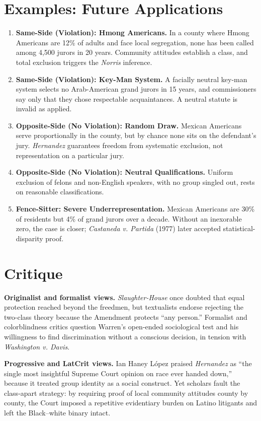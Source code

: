\documentclass[12pt]{article}
\begin{document}
\section{Examples: Future Applications}

\begin{enumerate}
\item \textbf{Same-Side (Violation): Hmong Americans.} In a county where Hmong Americans are 12\% of adults and face local segregation, none has been called among 4,500 jurors in 20 years. Community attitudes establish a class, and total exclusion triggers the \textit{Norris} inference.
\item \textbf{Same-Side (Violation): Key-Man System.} A facially neutral key-man system selects no Arab-American grand jurors in 15 years, and commissioners say only that they chose respectable acquaintances. A neutral statute is invalid as applied.
\item \textbf{Opposite-Side (No Violation): Random Draw.} Mexican Americans serve proportionally in the county, but by chance none sits on the defendant's jury. \textit{Hernandez} guarantees freedom from systematic exclusion, not representation on a particular jury.
\item \textbf{Opposite-Side (No Violation): Neutral Qualifications.} Uniform exclusion of felons and non-English speakers, with no group singled out, rests on reasonable classifications.
\item \textbf{Fence-Sitter: Severe Underrepresentation.} Mexican Americans are 30\% of residents but 4\% of grand jurors over a decade. Without an inexorable zero, the case is closer; \textit{Castaneda v. Partida} (1977) later accepted statistical-disparity proof.
\end{enumerate}

\section{Critique}

\textbf{Originalist and formalist views.} \textit{Slaughter-House} once doubted that equal protection reached beyond the freedmen, but textualists endorse rejecting the two-class theory because the Amendment protects ``any person.'' Formalist and colorblindness critics question Warren's open-ended sociological test and his willingness to find discrimination without a conscious decision, in tension with \textit{Washington v. Davis}.

\textbf{Progressive and LatCrit views.} Ian Haney L\'{o}pez praised \textit{Hernandez} as ``the single most insightful Supreme Court opinion on race ever handed down,'' because it treated group identity as a social construct. Yet scholars fault the class-apart strategy: by requiring proof of local community attitudes county by county, the Court imposed a repetitive evidentiary burden on Latino litigants and left the Black--white binary intact.
\end{document}
